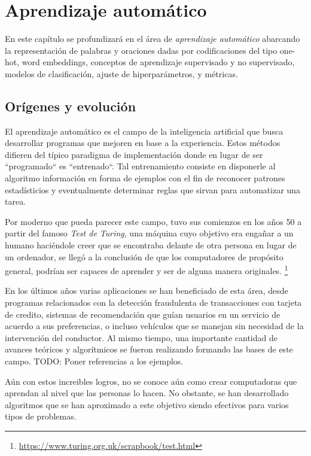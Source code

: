 \chapter{Aprendizaje automático}

En este capítulo se profundizará en el área de \emph{aprendizaje automático}
abarcando la representación de palabras y oraciones dadas por codificaciones del
tipo one-hot, word embeddings, conceptos de aprendizaje supervisado y no
supervisado, modelos de clasificación, ajuste de hiperparámetros, y métricas.

\section{Orígenes y evolución}

El aprendizaje automático es el campo de la inteligencia artificial que busca
desarrollar programas que mejoren en base a la experiencia. Estos métodos
difieren del típico paradigma de implementación donde en lugar de ser
``programado`` es ``entrenado``. Tal entrenamiento consiste en disponerle al
algoritmo información en forma de ejemplos con el fin de reconocer patrones
estadísticios y eventualmente determinar reglas que sirvan para automatizar una
tarea.

Por moderno que pueda parecer este campo, tuvo sus comienzos en los años 50 a
partir del famoso \emph{Test de Turing}, una máquina cuyo objetivo era engañar a
un humano haciéndole creer que se encontraba delante de otra persona en lugar de
un ordenador, se llegó  a la conclusión de que los computadores de propósito
general, podrían ser capaces de aprender y ser de alguna manera originales.
\footnote{\url{https://www.turing.org.uk/scrapbook/test.html}}

En los últimos años varias aplicaciones se han beneficiado de esta área, desde
programas relacionados con la detección fraudulenta de transacciones con tarjeta
de credito, sistemas de recomendación que guían usuarios en un servicio de
acuerdo a sus preferencias, o incluso vehículos que se manejan sin necesidad de
la intervención del conductor. Al mismo tiempo, una importante cantidad de
avances teóricos y algorítmicos se fueron realizando formando las bases de este
campo. TODO: Poner referencias a los ejemplos.

Aún con estos increibles logros, no se conoce aún como crear computadoras que
aprendan al nivel que las personas lo hacen. No obstante, se han desarrollado
algoritmos que se han aproximado a este objetivo siendo efectivos para varios
tipos de problemas.

